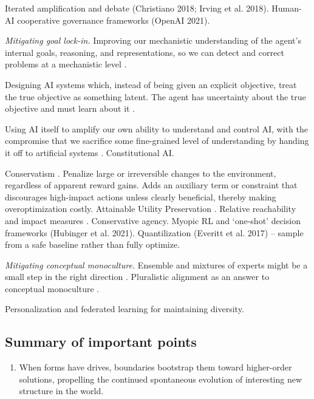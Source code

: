 Iterated amplification and debate (Christiano 2018; Irving et al. 2018). Human-AI cooperative governance frameworks (OpenAI 2021).


\textit{Mitigating goal lock-in.} Improving our mechanistic understanding of the agent's internal goals, reasoning, and representations, so we can detect and correct problems at a mechanistic level \citep{olah2020zoom, burns2022discovering, bereska2024mechanistic, anthropic2024mapping}.

Designing AI systems which, instead of being given an explicit objective, treat the true objective as something latent. The agent has uncertainty about the true objective and must learn about it \citep{russell2019human, hadfieldmenell2017off, hadfieldmenell2016cooperative, shah2020benefits, jeon2020reward}. 

Using AI itself to amplify our own ability to understand and control AI, with the compromise that we sacrifice some fine-grained level of understanding by handing it off to artificial systems \citep{amodei2016concrete}. Constitutional AI.

Conservatism \citep{cohen2024regulating}. Penalize large or irreversible changes to the environment, regardless of apparent reward gains. Adds an auxiliary term or constraint that discourages high-impact actions unless clearly beneficial, thereby making overoptimization costly. Attainable Utility Preservation \citep{turner2020conservative}. Relative reachability and impact measures \citep{krakovna2018penalizing}. Conservative agency. Myopic RL and `one-shot' decision frameworks (Hubinger et al. 2021). Quantilization (Everitt et al. 2017) -- sample from a safe baseline rather than fully optimize.



\textit{Mitigating conceptual monoculture.} Ensemble and mixtures of experts might be a small step in the right direction \citep{lakshminarayanan2017simple, shazeer2017outrageously}. Pluralistic alignment as an answer to conceptual monoculture \citep{sorensen2024roadmap}.

Personalization and federated learning \citep{mcmahan2017communication, kirk2024benefits} for maintaining diversity.



\subsection{Summary of important points}

\begin{enumerate}
    \item When forms have drives, boundaries bootstrap them toward higher-order solutions, propelling the continued spontaneous evolution of interesting new structure in the world. 
\end{enumerate}


